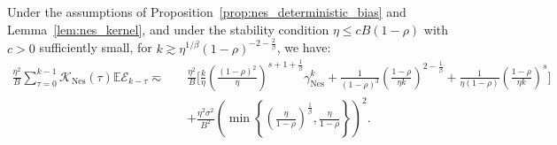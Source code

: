 \begin{proposition}
\label{prop:nes_self_noise_bounds}
Under the assumptions of Proposition~\ref{prop:nes_deterministic_bias} and Lemma~\ref{lem:nes_kernel}, and under the stability condition $\eta\le cB(1-\rho)$ with $c>0$ sufficiently small, for $k \gtrsim \eta^{1/\beta}(1-\rho)^{-2-\frac{2}{\beta}}$, we have:
\begin{align*}
    \frac{\eta^2}{B}\sum_{\tau=0}^{k-1}\mathcal K_{\mathrm{Nes}}(\tau)\mathbb{E}\mathcal E_{k-\tau}
    \eqsim\quad
    &\frac{\eta^2}{B}\bigg[
        \frac{k}{\eta} \left(\frac{(1-\rho)^2}{\eta}\right)^{s+1+\frac{1}{\beta}} \gamma_{\mathrm{Nes}}^k
        + \frac1{(1-\rho)^3}\left(\frac{1-\rho}{\eta k}\right)^{2-\frac1\beta} 
        + \frac1{\eta(1-\rho)}\left(\frac{1-\rho}{\eta k}\right)^s
    \bigg] \\
    &+ \frac{\eta^2\sigma^2}{B^2} \left( \min\left\{\left(\frac{\eta}{1-\rho}\right)^{\frac1\beta}, \frac{\eta}{1-\rho}\right\} \right)^2.
\end{align*}
\end{proposition}

